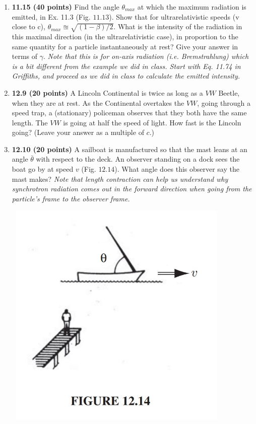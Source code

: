 \documentclass[fleqn]{article}
\begin{document}
  \begin{enumerate}
    \item \textbf{11.15 (40 points)} Find the angle $\theta_{max}$ at which the maximum radiation is emitted, in
    Ex. 11.3 (Fig. $11.13$). Show that for ultrarelativistic speeds (v close to c), $\theta_{max} \approxeq \sqrt{(1-\beta)/2}$. 
    What is the intensity of the radiation in this maximal direction (in the ultrarelativistic case), in proportion 
    to the same quantity for a particle instantaneously at rest? Give your answer in terms of $\gamma$.
    \emph{Note that this is for on-axis radiation (i.e. Bremstrahlung) which is a bit different from the example we 
    did in class.  Start with Eq. 11.74 in Griffiths, and proceed as we did in class to calculate the emitted intensity.}


    \item \textbf{12.9 (20 points)} A Lincoln Continental is twice as long as a $VW$ Beetle, when they
    are at rest. As the Continental overtakes the $VW$, going through a speed trap, a
    (stationary) policeman observes that they both have the same length. The $VW$ is
    going at half the speed of light. How fast is the Lincoln going? (Leave your answer
    as a multiple of $c$.)


    \item \textbf{12.10 (20 points)} A sailboat is manufactured so that the mast leans at an angle $\bar{\theta}$ with
    respect to the deck. An observer standing on a dock sees the boat go by at speed $v$
    (Fig. $12.14$). What angle does this observer say the mast makes?
    \emph{Note that length contraction can help us understand why synchrotron radiation comes out in the 
    forward direction when going from the particle's frame to the observer frame.}
    \begin{center}
      \includegraphics[height=11cm, width=11cm]{1214.JPG}
    \end{center}


  \end{enumerate}
\end{document}
